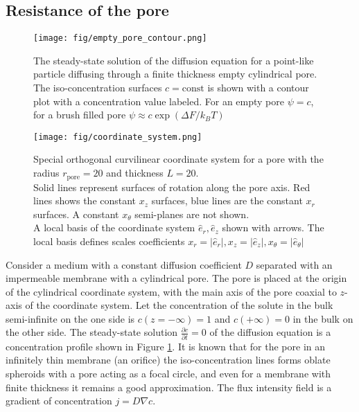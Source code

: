 \documentclass[10pt, a4paper]{article}
\begin{document}
\subsection*{Resistance of the pore}

\begin{multicols}{2}

\begin{figure}[H]
    \centering
    \texttt{[image: fig/empty\_pore\_contour.png]}
    \caption{
        The steady-state solution of the diffusion equation for a point-like particle diffusing through a finite thickness empty cylindrical pore.
        The iso-concentration surfaces $c = \textrm{const}$ is shown with a contour plot with a concentration value labeled.
        For an empty pore $\psi = c$, for a brush filled pore $\psi \approx c\exp(\Delta F / k_B T)$
        }
    \label{fig:empty_pore_solution}
\end{figure}
\begin{figure}[H]
    \centering
    \texttt{[image: fig/coordinate\_system.png]}
    \caption{
        Special orthogonal curvilinear coordinate system for a pore with the radius $r_{\textrm{pore}} = 20$ and thickness $L=20$.
        \\
        Solid lines represent surfaces of rotation along the pore axis.
        Red lines shows the constant $x_{z}$ surfaces, blue lines are the constant $x_{r}$ surfaces.
        A constant $x_{\theta}$ semi-planes are not shown.
        \\
        A local basis of the coordinate system $\hat{e}_r, \hat{e}_z$ shown with arrows.
        The local basis defines scales coefficients $x_r = |\hat{e}_r|, x_z = |\hat{e}_z|, x_{\theta} = |\hat{e}_{\theta}|$
        }
    \label{fig:coordinate_system}
\end{figure}

Consider a medium with a constant diffusion coefficient $D$ separated with an impermeable membrane with a cylindrical pore. 
The pore is placed at the origin of the cylindrical coordinate system, with the main axis of the pore coaxial to $z$-axis of the coordinate system.
Let the concentration of the solute in the bulk semi-infinite on the one side is $c(z=-\infty)=1$ and $c(+\infty)=0$ in the bulk on the other side.
The steady-state solution $\frac{\partial c}{\partial t} = 0$ of the diffusion equation is a concentration profile shown in Figure \ref{fig:empty_pore_solution}.
It is known that for the pore in an infinitely thin membrane (an orifice) the iso-concentration lines forms oblate spheroids with a pore acting as a focal circle, and even for a membrane with finite thickness it remains a good approximation. 
The flux intensity field is a gradient of concentration $j = D\nabla c$.


\end{multicols}
\end{document}
